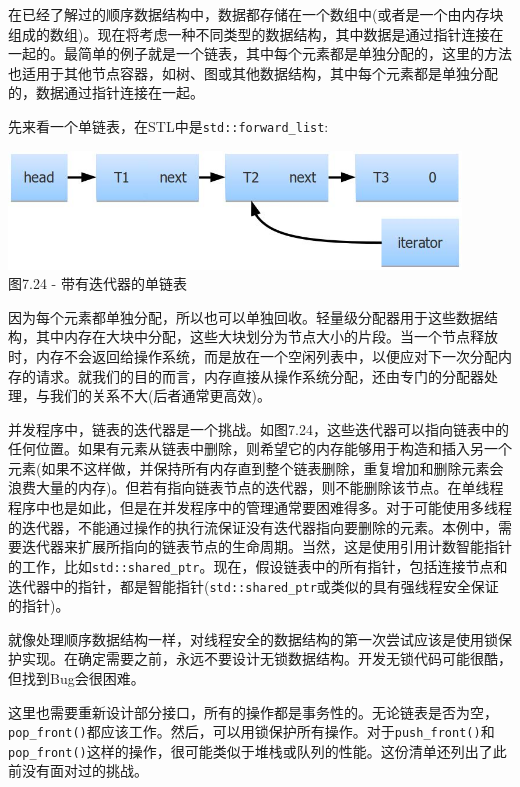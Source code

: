 
在已经了解过的顺序数据结构中，数据都存储在一个数组中(或者是一个由内存块组成的数组)。现在将考虑一种不同类型的数据结构，其中数据是通过指针连接在一起的。最简单的例子就是一个链表，其中每个元素都是单独分配的，这里的方法也适用于其他节点容器，如树、图或其他数据结构，其中每个元素都是单独分配的，数据通过指针连接在一起。

先来看一个单链表，在STL中是\texttt{std::forward\_list}:

\begin{center}
\includegraphics[width=0.9\textwidth]{content/2/chapter7/images/24.jpg}\\
图7.24 - 带有迭代器的单链表
\end{center}

因为每个元素都单独分配，所以也可以单独回收。轻量级分配器用于这些数据结构，其中内存在大块中分配，这些大块划分为节点大小的片段。当一个节点释放时，内存不会返回给操作系统，而是放在一个空闲列表中，以便应对下一次分配内存的请求。就我们的目的而言，内存直接从操作系统分配，还由专门的分配器处理，与我们的关系不大(后者通常更高效)。

并发程序中，链表的迭代器是一个挑战。如图7.24，这些迭代器可以指向链表中的任何位置。如果有元素从链表中删除，则希望它的内存能够用于构造和插入另一个元素(如果不这样做，并保持所有内存直到整个链表删除，重复增加和删除元素会浪费大量的内存)。但若有指向链表节点的迭代器，则不能删除该节点。在单线程程序中也是如此，但是在并发程序中的管理通常要困难得多。对于可能使用多线程的迭代器，不能通过操作的执行流保证没有迭代器指向要删除的元素。本例中，需要迭代器来扩展所指向的链表节点的生命周期。当然，这是使用引用计数智能指针的工作，比如\texttt{std::shared\_ptr}。现在，假设链表中的所有指针，包括连接节点和迭代器中的指针，都是智能指针(\texttt{std::shared\_ptr}或类似的具有强线程安全保证的指针)。

就像处理顺序数据结构一样，对线程安全的数据结构的第一次尝试应该是使用锁保护实现。在确定需要之前，永远不要设计无锁数据结构。开发无锁代码可能很酷，但找到Bug会很困难。

这里也需要重新设计部分接口，所有的操作都是事务性的。无论链表是否为空，\texttt{pop\_front()}都应该工作。然后，可以用锁保护所有操作。对于\texttt{push\_front()}和\texttt{pop\_front()}这样的操作，很可能类似于堆栈或队列的性能。这份清单还列出了此前没有面对过的挑战。

